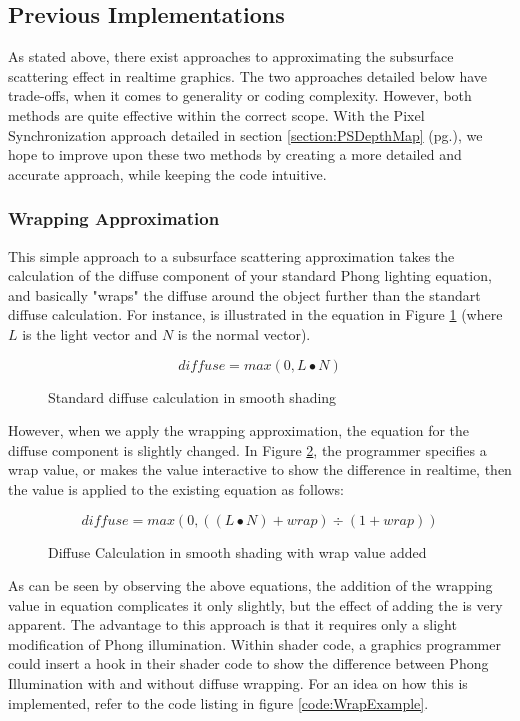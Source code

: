 \documentclass[a4paper, 12pt]{article}
\begin{document}
\subsection{Previous Implementations}

As stated above, there exist approaches to approximating the subsurface
scattering effect in realtime graphics. The two approaches detailed below have
trade-offs, when it comes to generality or coding complexity. However, both
methods are quite effective within the correct scope. With the Pixel
Synchronization approach detailed in section 
\ref{section:PSDepthMap} (pg.\pageref{section:PSDepthMap}), we hope to improve
upon these two methods by creating a more detailed and accurate approach,
while keeping the code intuitive.

\subsubsection{Wrapping Approximation}
\label{section:wrapping}
This simple approach to a subsurface scattering approximation takes the
calculation of the diffuse component of your standard Phong lighting equation,
and basically "wraps" the diffuse around the object further than the standart
diffuse calculation. For instance, is illustrated in the equation in Figure
\ref{equation:diffuse} (where $L$ is the light vector and $N$ is the normal
vector).

\begin{figure}[h]
\[diffuse = max(0, L \bullet N)\]
\caption{Standard diffuse calculation in smooth shading}
\label{equation:diffuse}
\end{figure}

\noindent However, when we apply the wrapping approximation, the equation for
the diffuse component is slightly changed. In Figure \ref{equation:wrap}, the
programmer specifies a wrap value, or makes the value interactive to show the
difference in realtime, then the value is applied to the existing equation as
follows:

\begin{figure}[h]
\[diffuse = max(0,((L\bullet N) + wrap) \div (1 + wrap))\]
\caption{Diffuse Calculation in smooth shading with wrap value added}
\label{equation:wrap}
\end{figure}


\noindent As can be seen by observing the above equations, the addition of the
wrapping value in equation complicates it only slightly, but the effect of
adding the is very apparent. The advantage to this approach is that it
requires only a slight modification of Phong illumination. Within shader code,
a graphics programmer could insert a hook in their shader code to show the
difference between Phong Illumination with and without diffuse wrapping. For
an idea on how this is implemented, refer to the code listing in figure
\ref{code:WrapExample}.
\end{document}
